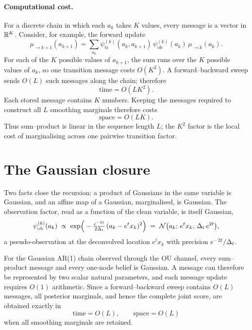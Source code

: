 \paragraph{Computational cost.}
For a discrete chain in which each $a_k$ takes $K$ values, every message is a
vector in $\mathbb{R}^K$. Consider, for example, the forward update
\[
  \mu_{\to k+1}(a_{k+1})
  =
  \sum_{a_k}
  \psi_{\mathrm{tr}}^{(k)}(a_k,a_{k+1})\,
  \psi_{\mathrm{ob}}^{(k)}(a_k)\,
  \mu_{\to k}(a_k).
\]
For each of the $K$ possible values of $a_{k+1}$, the sum runs over the $K$
possible values of $a_k$, so one transition message costs $O(K^2)$. A
forward--backward sweep sends $O(L)$ such messages along the chain; therefore
\begin{equation}
  \boxed{
  \text{time}=O(LK^2).
  }
  \label{eq:bp-time}
\end{equation}
Each stored message contains $K$ numbers. Keeping the messages required to
construct all $L$ smoothing marginals therefore costs
\begin{equation}
  \boxed{
  \text{space}=O(LK).
  }
  \label{eq:bp-space}
\end{equation}
Thus sum--product is linear in the sequence length $L$; the $K^2$ factor is
the local cost of marginalising across one pairwise transition factor.



\section{The Gaussian closure}
\label{sec:bp-gaussian}

Two facts close the recursion: a product of
Gaussians in the same variable is Gaussian, and an
affine map of a Gaussian, marginalised, is Gaussian.
The observation factor, read as a function of the clean variable, is itself
Gaussian,
\begin{equation*}
  \psi^{(k)}_{\mathrm{ob}}(a_k)
  \;\propto\; \exp\!\Big(-\tfrac{e^{-2t}}{2\Delta_t}\,(a_k - e^{t} x_k)^2\Big)
  \;=\; \mathcal{N}\big(a_k;\, e^{t} x_k,\, \Delta_t\, e^{2t}\big),
\end{equation*}
a pseudo-observation at the deconvolved location $e^t x_k$ with precision
$e^{-2t}/\Delta_t$.


\begin{theorem}
\label{thm:bp-closure}
For the Gaussian AR(1) chain observed through the OU channel, every
sum--product message and every one-node belief is Gaussian. A message can
therefore be represented by two scalar natural parameters, and each message
update requires $O(1)$ arithmetic. Since a forward--backward sweep contains
$O(L)$ messages, all posterior marginals, and hence the complete joint score,
are obtained exactly in
\begin{equation}
  \boxed{
  \text{time}=O(L),
  \qquad
  \text{space}=O(L)
  }
\end{equation}
when all smoothing marginals are retained.
\end{theorem}

